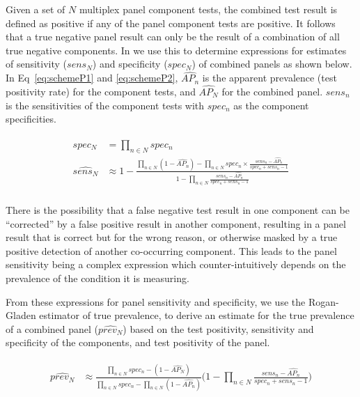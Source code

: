 \documentclass[10pt,letterpaper]{article}
\begin{document}
Given a set of \(N\) multiplex panel component tests, the combined test result is defined as positive if any of the panel component tests are positive. It follows that a true negative panel result can only be the result of a combination of all true negative components. In  we use this to determine expressions for estimates of sensitivity (\(sens_N\)) and specificity (\(spec_N\)) of combined panels as shown below. In Eq~\ref{eq:schemeP1} and \ref{eq:schemeP2}, \(\widehat{AP_n}\) is the apparent prevalence (test positivity rate) for the component tests, and \(\widehat{AP_N}\) for the combined panel. \(sens_n\) is the sensitivities of the component tests with \(spec_n\) as the component specificities.

\begin{eqnarray}
\label{eq:schemeP1}
\begin{aligned}
spec_N &= \prod_{n \in N}{spec_n} \\
\widehat{sens_N} &\approx 1-\frac{
  \prod_{n \in N}{(1-\widehat{AP_n})} - \prod_{n \in N}{spec_n \times \frac{sens_n-\widehat{AP_n}}{spec_n + sens_n - 1}}
}{
  1 - \prod_{n \in N}{ \frac{sens_n-\widehat{AP_n}}{spec_n + sens_n - 1} }
} \\
\end{aligned}
\end{eqnarray}

There is the possibility that a false negative test result in one component can be ``corrected'' by a false positive result in another component, resulting in a panel result that is correct but for the wrong reason, or otherwise masked by a true positive detection of another co-occurring component. This leads to the panel sensitivity being a complex expression which counter-intuitively depends on the prevalence of the condition it is measuring.

From these expressions for panel sensitivity and specificity, we use the Rogan-Gladen estimator of true prevalence\cite{rogan1978}, to derive an estimate for the true prevalence of a combined panel (\(\widehat{prev_N}\)) based on the test positivity, sensitivity and specificity of the components, and test positivity of the panel.

\begin{eqnarray}
\label{eq:schemeP2}
\begin{aligned}
\widehat{prev_{N}} &\approx \frac{
    \prod_{n \in N}{spec_n} -(1-\widehat{AP_{N}})
  }{
    \prod_{n \in N}{spec_n}
    -\prod_{n \in N}{(1-\widehat{AP_n})}
  } \bigg(1 - \prod_{n \in N}{ \frac{sens_n-\widehat{AP_n}}{spec_n + sens_n - 1} } \bigg ) \\
\end{aligned}
\end{eqnarray}
\end{document}
